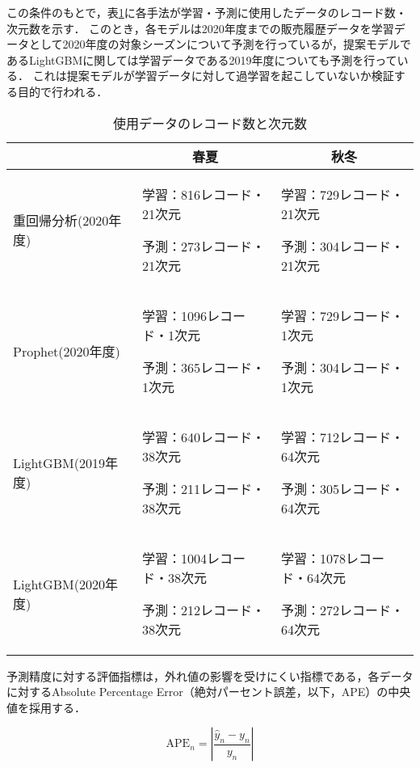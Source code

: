 \documentclass[dvipdfmx]{jreport}
\begin{document}
この条件のもとで，表\ref{tab:05}に各手法が学習・予測に使用したデータのレコード数・次元数を示す．
このとき，各モデルは2020年度までの販売履歴データを学習データとして2020年度の対象シーズンについて予測を行っているが，提案モデルであるLightGBMに関しては学習データである2019年度についても予測を行っている．
これは提案モデルが学習データに対して過学習を起こしていないか検証する目的で行われる．

\begin{table}[h]
    \centering
    \caption{使用データのレコード数と次元数}\label{tab:05}
    \begin{tabular}{|p{}||p{}|p{}|} \hline
        \rowcolor{gray!20} %
         & \multicolumn{1}{c|}{\textbf{春夏}} & \multicolumn{1}{c|}{\textbf{秋冬}} \\ \hline \hline
        重回帰分析(2020年度) & 学習：816レコード・21次元 \par 予測：273レコード・21次元 & 学習：729レコード・21次元 \par 予測：304レコード・21次元 \\ \hline
        Prophet(2020年度) & 学習：1096レコード・1次元 \par 予測：365レコード・1次元 & 学習：729レコード・1次元 \par 予測：304レコード・1次元\\ \hline
        LightGBM(2019年度) & 学習：640レコード・38次元 \par 予測：211レコード・38次元 & 学習：712レコード・64次元 \par 予測：305レコード・64次元 \\ \hline
        LightGBM(2020年度) & 学習：1004レコード・38次元 \par 予測：212レコード・38次元 & 学習：1078レコード・64次元 \par 予測：272レコード・64次元\\ \hline
    \end{tabular}
\end{table}


予測精度に対する評価指標は，外れ値の影響を受けにくい指標である，各データに対するAbsolute Percentage Error（絶対パーセント誤差，以下，APE）の中央値を採用する．

\begin{equation}
    \text{APE}_n = |\frac{\hat{y}_n - y_n}{y_n}|
    \label{eq:ape}
\end{equation}
\end{document}
